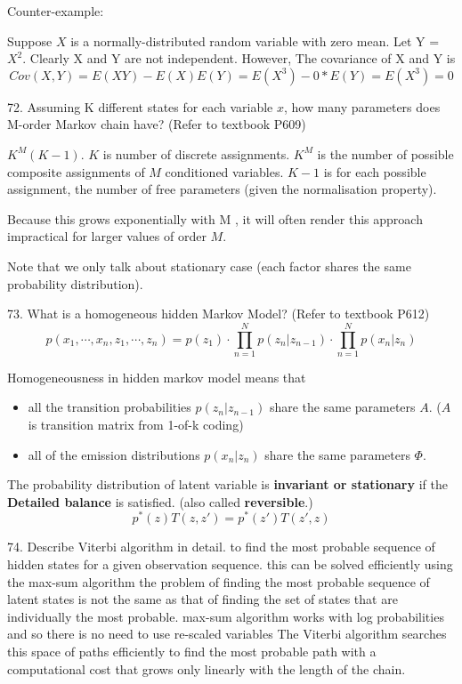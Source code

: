 \documentclass[11pt,a4paper]{article}
\newcommand{\BOLD}[1]{\textbf{#1}}
\begin{document}
    Counter-example: 

    Suppose $X$ is a normally-distributed random variable with zero mean.  Let Y = $X^2$.  Clearly X and Y are not independent.
    However, The covariance of X and Y is
    $$ Cov(X,Y) = E(XY) - E(X)E(Y) = E(X^3) - 0*E(Y) = E(X^3)  = 0 $$

72. Assuming K different states for each variable $x$, how many parameters does M-order Markov chain have? (Refer to textbook P609)
    
$ K^M (K - 1)$. $K$ is number of discrete assignments. $K^M$ is the number of possible composite assignments of $M$ conditioned variables. $K-1$ is for each possible assignment, the number of free parameters (given the normalisation property).

 Because this grows exponentially with M , it will often render this approach impractical for larger values of order $M$.

 Note that we only talk about stationary case (each factor shares the same probability distribution).

 73. What is a homogeneous hidden Markov Model? (Refer to textbook P612)
    $$ p(x_1, \cdots, x_n, z_1, \cdots, z_n) = p(z_1) \cdot \prod_{n=1}^{N} p(z_n | z_{n-1}) \cdot \prod_{n=1}^{N} p(x_n | z_n) $$

    Homogeneousness in hidden markov model means that
    \begin{itemize}
        \item all the transition probabilities $p(z_n | z_{n-1})$ share the same parameters $A$. ($A$ is transition matrix from 1-of-k coding)
        \item all of the emission distributions $p(x_n | z_n)$ share the same parameters $\Phi$.
        \end{itemize}

    The probability distribution of latent variable is \BOLD{invariant or stationary} if the \BOLD{Detailed balance} is satisfied. (also called \BOLD{reversible}.)
    $$ p^{*}(z) T(z,z') = p^{*}(z')T(z', z) $$

74. Describe Viterbi algorithm in detail.
    to find the most probable sequence of hidden states for a given observation sequence. this can be solved efficiently using the max-sum algorithm
    the problem of finding the most probable sequence of latent states is not the same as that of finding the set of states that are individually the most probable.
    max-sum algorithm works with log probabilities and so there is no need to use re-scaled variables
    The Viterbi algorithm searches this space of paths efficiently to find the most probable path with a computational cost that grows only linearly with the length of the chain.
\end{document}
